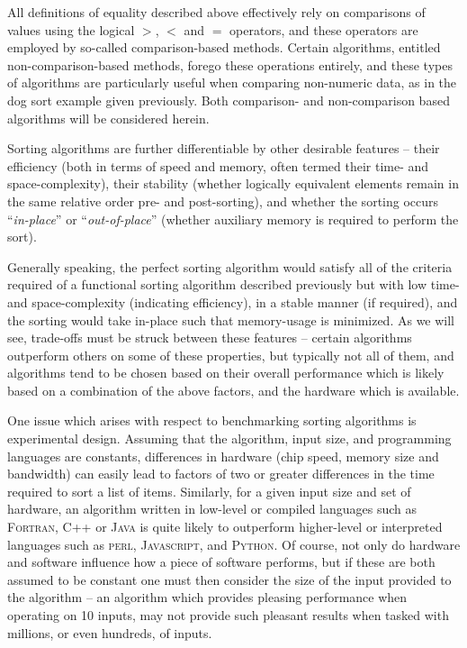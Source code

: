 \documentclass[12pt,a4paper]{article}
\begin{document}
All definitions of equality described above effectively rely on comparisons of values using the logical $>$, $<$ and $=$ operators, and these operators are employed by so-called comparison-based methods. Certain algorithms, entitled non-comparison-based methods, forego these operations entirely, and these types of algorithms are particularly useful when comparing non-numeric data, as in the dog sort example given previously. Both comparison- and non-comparison based algorithms will be considered herein.

Sorting algorithms are further differentiable by other desirable features -- their efficiency (both in terms of speed and memory, often termed their time- and space-complexity), their stability (whether logically equivalent elements remain in the same relative order pre- and post-sorting), and whether the sorting occurs ``\emph{in-place}'' or ``\emph{out-of-place}'' (whether auxiliary memory is required to perform the sort). 

Generally speaking, the perfect sorting algorithm would satisfy all of the criteria required of a functional sorting algorithm described previously but with low time- and space-complexity (indicating efficiency), in a stable manner (if required), and the sorting would take in-place such that memory-usage is minimized. As we will see, trade-offs must be struck between these features -- certain algorithms outperform others on some of these properties, but typically not all of them, and algorithms tend to be chosen based on their overall performance which is likely based on a combination of the above factors, and the hardware which is available.

One issue which arises with respect to benchmarking sorting algorithms is experimental design. Assuming that the algorithm, input size, and programming languages are constants, differences in hardware (chip speed, memory size and bandwidth) can easily lead to factors of two or greater differences in the time required to sort a list of items. Similarly, for a given input size and set of hardware, an algorithm written in low-level or compiled languages such as \textsc{Fortran}, \textsc{C++} or \textsc{Java} is quite likely to outperform higher-level or interpreted languages such as \textsc{perl}, \textsc{Javascript}, and \textsc{Python}. Of course, not only do hardware and software influence how a piece of software performs, but if these are both assumed to be constant one must then consider the size of the input provided to the algorithm -- an algorithm which provides pleasing performance when operating on 10 inputs, may not provide such pleasant results when tasked with millions, or even hundreds, of inputs.
\end{document}
